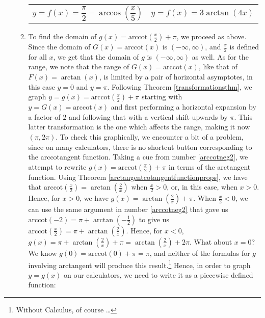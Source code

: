 \documentclass[12pt]{ximera}
\begin{document}
\begin{example}
\begin{enumerate}
\begin{enumerate}
\smallskip

\begin{tabular}{cc}

 \\ 

$y =f(x) = \dfrac{\pi}{2} - \arccos\left(\dfrac{x}{5}\right)$ & \hspace{0.75in} $y = f(x) = 3\arctan\left(4x \right)$
\end{tabular} 

\item  To find the domain of $g(x) = \text{arccot}\left(\frac{x}{2}\right) + \pi$, we proceed as above.  Since the domain of $G(x) = \text{arccot}(x)$ is $(-\infty, \infty)$, and $\frac{x}{2}$ is defined for all $x$, we get that the domain of $g$ is $(-\infty, \infty)$ as well.  As for the range, we note that the range of $G(x)  = \text{arccot}(x)$, like that of $F(x) = \arctan(x)$, is limited by a pair of horizontal asymptotes, in this case $y = 0$ and $y = \pi$.  Following  Theorem \ref{transformationsthm}, we graph $y =  g(x) = \text{arccot}\left(\frac{x}{2}\right) + \pi$ starting with $y = G(x) = \text{arccot}(x)$ and first performing a horizontal expansion by a factor of $2$ and following that with a vertical shift upwards by $\pi$.  This latter transformation is the one which affects the range, making it now $(\pi, 2\pi)$.  To check this graphically, we encounter a bit of a problem, since on many calculators, there is no shortcut button corresponding to the arccotangent function. Taking a cue from number \ref{arccotneg2}, we attempt to rewrite $g(x) = \text{arccot}\left(\frac{x}{2}\right) + \pi$ in terms of the arctangent function. Using Theorem \ref{arctangentcotangentfunctionprops}, we have that $\text{arccot}\left(\frac{x}{2}\right) = \arctan\left(\frac{2}{x}\right)$ when $\frac{x}{2} > 0$, or, in this case, when $x > 0$.  Hence, for $x > 0$, we have $g(x) = \arctan\left(\frac{2}{x}\right) + \pi$.  When $\frac{x}{2} < 0$, we can use the same argument in number \ref{arccotneg2} that gave us $\text{arccot}(-2) = \pi + \arctan\left(-\frac{1}{2}\right)$ to give us $\text{arccot}\left(\frac{x}{2}\right) = \pi + \arctan\left(\frac{2}{x}\right)$.  Hence, for $x < 0$, $g(x) = \pi + \arctan\left(\frac{2}{x}\right) + \pi = \arctan\left(\frac{2}{x}\right) + 2\pi$.  What about $x=0$?  We know $g(0) = \text{arccot}(0) + \pi = \pi$, and neither of the formulas for $g$ involving arctangent will produce this result.\footnote{Without Calculus, of course \ldots}  Hence, in order to graph $y = g(x)$ on our calculators, we need to write it as a piecewise defined function:


\end{enumerate}
\end{enumerate}
\end{example}
\end{document}
